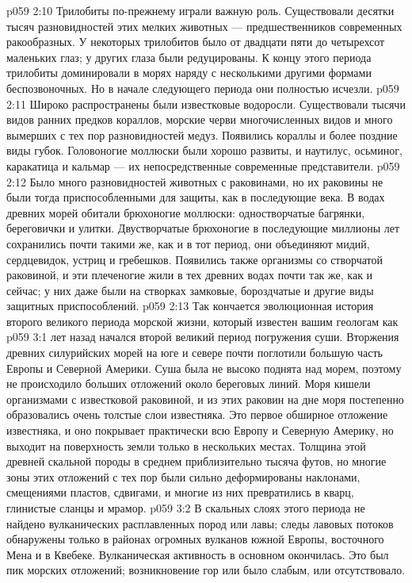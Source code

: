 \vs p059 2:10 Трилобиты по\hyp{}прежнему играли важную роль. Существовали десятки тысяч разновидностей этих мелких животных --- предшественников современных ракообразных. У некоторых трилобитов было от двадцати пяти до четырехсот маленьких глаз; у других глаза были редуцированы. К концу этого периода трилобиты доминировали в морях наряду с несколькими другими формами беспозвоночных. Но в начале следующего периода они полностью исчезли.
\vs p059 2:11 Широко распространены были известковые водоросли. Существовали тысячи видов ранних предков кораллов, морские черви многочисленных видов и много вымерших с тех пор разновидностей медуз. Появились кораллы и более поздние виды губок. Головоногие моллюски были хорошо развиты, и наутилус, осьминог, каракатица и кальмар --- их непосредственные современные представители.
\vs p059 2:12 Было много разновидностей животных с раковинами, но их раковины не были тогда приспособленными для защиты, как в последующие века. В водах древних морей обитали брюхоногие моллюски: одностворчатые багрянки, береговички и улитки. Двустворчатые брюхоногие в последующие миллионы лет сохранились почти такими же, как и в тот период, они объединяют мидий, сердцевидок, устриц и гребешков. Появились также организмы со створчатой раковиной, и эти плеченогие жили в тех древних водах почти так же, как и сейчас; у них даже были на створках замковые, бороздчатые и другие виды защитных приспособлений.
\vs p059 2:13 \pc Так кончается эволюционная история второго великого периода морской жизни, который известен вашим геологам как 
\vs p059 3:1  лет назад начался второй великий период погружения суши. Вторжения древних силурийских морей на юге и севере почти поглотили большую часть Европы и Северной Америки. Суша была не высоко поднята над морем, поэтому не происходило больших отложений около береговых линий. Моря кишели организмами с известковой раковиной, и из этих раковин на дне моря постепенно образовались очень толстые слои известняка. Это первое обширное отложение известняка, и оно покрывает практически всю Европу и Северную Америку, но выходит на поверхность земли только в нескольких местах. Толщина этой древней скальной породы в среднем приблизительно тысяча футов, но многие зоны этих отложений с тех пор были сильно деформированы наклонами, смещениями пластов, сдвигами, и многие из них превратились в кварц, глинистые сланцы и мрамор.
\vs p059 3:2 В скальных слоях этого периода не найдено вулканических расплавленных пород или лавы; следы лавовых потоков обнаружены только в районах огромных вулканов южной Европы, восточного Мена и в Квебеке. Вулканическая активность в основном окончилась. Это был пик морских отложений; возникновение гор или было слабым, или отсутствовало.
